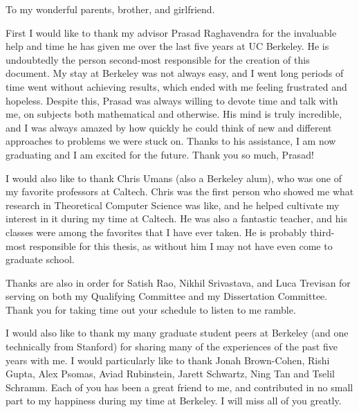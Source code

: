 \documentclass{ucbthesis}
\begin{document}
\begin{frontmatter}

\begin{dedication}
\null\vfil
\begin{center}
To my wonderful parents, brother, and girlfriend. 
\end{center}
\vfil\null
\end{dedication}

\tableofcontents
\clearpage

\begin{acknowledgements}
First I would like to thank my advisor Prasad Raghavendra for the invaluable help and time he has given me over the last five years at UC Berkeley.
He is undoubtedly the person second-most responsible for the creation of this document. 
My stay at Berkeley was not always easy, and I went long periods of time went without achieving results, which ended with me feeling frustrated and hopeless.
Despite this, Prasad was always willing to devote time and talk with me, on subjects both mathematical and otherwise. 
His mind is truly incredible, and I was always amazed by how quickly he could think of new and different approaches to problems we were stuck on. 
Thanks to his assistance, I am now graduating and I am excited for the future. 
Thank you so much, Prasad!

I would also like to thank Chris Umans (also a Berkeley alum), who was one of my favorite professors at Caltech. 
Chris was the first person who showed me what research in Theoretical Computer Science was like, and he helped cultivate my interest in it during my time at Caltech.
He was also a fantastic teacher, and his classes were among the favorites that I have ever taken. 
He is probably third-most responsible for this thesis, as without him I may not have even come to graduate school. 

Thanks are also in order for Satish Rao, Nikhil Srivastava, and Luca Trevisan for serving on both my Qualifying Committee and my Dissertation Committee.
Thank you for taking time out your schedule to listen to me ramble. 

I would also like to thank my many graduate student peers at Berkeley (and one technically from Stanford) for sharing many of the experiences of the past five years with me. 
I would particularly like to thank Jonah Brown-Cohen, Rishi Gupta, Alex Psomas, Aviad Rubinstein, Jarett Schwartz, Ning Tan and Tselil Schramm. 
Each of you has been a great friend to me, and contributed in no small part to my happiness during my time at Berkeley. 
I will miss all of you greatly. 


\end{acknowledgements}
\end{frontmatter}
\end{document}
